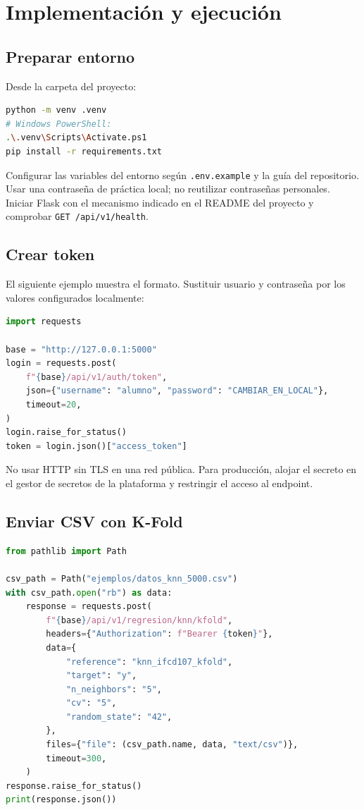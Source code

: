 \documentclass[11pt,a4paper]{article}
\begin{document}
\section{Implementación y ejecución}
\subsection{Preparar entorno}
Desde la carpeta del proyecto:
\begin{lstlisting}[language=bash]
python -m venv .venv
# Windows PowerShell:
.\.venv\Scripts\Activate.ps1
pip install -r requirements.txt
\end{lstlisting}
Configurar las variables del entorno según \texttt{.env.example} y la guía del repositorio. Usar una contraseña de práctica local; no reutilizar contraseñas personales. Iniciar Flask con el mecanismo indicado en el README del proyecto y comprobar \texttt{GET /api/v1/health}.

\subsection{Crear token}
El siguiente ejemplo muestra el formato. Sustituir usuario y contraseña por los valores configurados localmente:
\begin{lstlisting}[language=Python]
import requests

base = "http://127.0.0.1:5000"
login = requests.post(
    f"{base}/api/v1/auth/token",
    json={"username": "alumno", "password": "CAMBIAR_EN_LOCAL"},
    timeout=20,
)
login.raise_for_status()
token = login.json()["access_token"]
\end{lstlisting}
No usar HTTP sin TLS en una red pública. Para producción, alojar el secreto en el gestor de secretos de la plataforma y restringir el acceso al endpoint.

\subsection{Enviar CSV con K-Fold}
\begin{lstlisting}[language=Python]
from pathlib import Path

csv_path = Path("ejemplos/datos_knn_5000.csv")
with csv_path.open("rb") as data:
    response = requests.post(
        f"{base}/api/v1/regresion/knn/kfold",
        headers={"Authorization": f"Bearer {token}"},
        data={
            "reference": "knn_ifcd107_kfold",
            "target": "y",
            "n_neighbors": "5",
            "cv": "5",
            "random_state": "42",
        },
        files={"file": (csv_path.name, data, "text/csv")},
        timeout=300,
    )
response.raise_for_status()
print(response.json())
\end{lstlisting}
\end{document}
